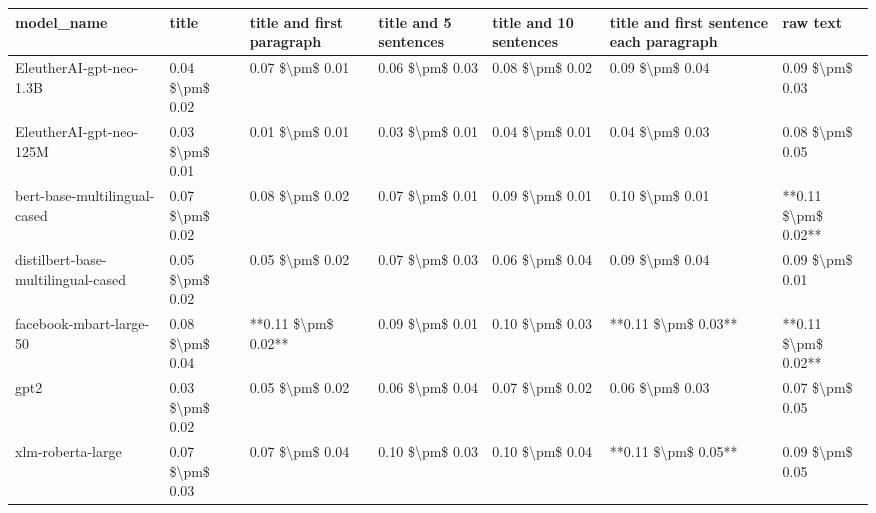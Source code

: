 \begin{tabular}{lllllll}
\toprule
                        model\_name &           title & title and first paragraph & title and 5 sentences & title and 10 sentences & title and first sentence each paragraph &            raw text \\
\midrule
           EleutherAI-gpt-neo-1.3B & 0.04 \$\textbackslash pm\$ 0.02 &           0.07 \$\textbackslash pm\$ 0.01 &       0.06 \$\textbackslash pm\$ 0.03 &        0.08 \$\textbackslash pm\$ 0.02 &                         0.09 \$\textbackslash pm\$ 0.04 &     0.09 \$\textbackslash pm\$ 0.03 \\
           EleutherAI-gpt-neo-125M & 0.03 \$\textbackslash pm\$ 0.01 &           0.01 \$\textbackslash pm\$ 0.01 &       0.03 \$\textbackslash pm\$ 0.01 &        0.04 \$\textbackslash pm\$ 0.01 &                         0.04 \$\textbackslash pm\$ 0.03 &     0.08 \$\textbackslash pm\$ 0.05 \\
      bert-base-multilingual-cased & 0.07 \$\textbackslash pm\$ 0.02 &           0.08 \$\textbackslash pm\$ 0.02 &       0.07 \$\textbackslash pm\$ 0.01 &        0.09 \$\textbackslash pm\$ 0.01 &                         0.10 \$\textbackslash pm\$ 0.01 & **0.11 \$\textbackslash pm\$ 0.02** \\
distilbert-base-multilingual-cased & 0.05 \$\textbackslash pm\$ 0.02 &           0.05 \$\textbackslash pm\$ 0.02 &       0.07 \$\textbackslash pm\$ 0.03 &        0.06 \$\textbackslash pm\$ 0.04 &                         0.09 \$\textbackslash pm\$ 0.04 &     0.09 \$\textbackslash pm\$ 0.01 \\
           facebook-mbart-large-50 & 0.08 \$\textbackslash pm\$ 0.04 &       **0.11 \$\textbackslash pm\$ 0.02** &       0.09 \$\textbackslash pm\$ 0.01 &        0.10 \$\textbackslash pm\$ 0.03 &                     **0.11 \$\textbackslash pm\$ 0.03** & **0.11 \$\textbackslash pm\$ 0.02** \\
                              gpt2 & 0.03 \$\textbackslash pm\$ 0.02 &           0.05 \$\textbackslash pm\$ 0.02 &       0.06 \$\textbackslash pm\$ 0.04 &        0.07 \$\textbackslash pm\$ 0.02 &                         0.06 \$\textbackslash pm\$ 0.03 &     0.07 \$\textbackslash pm\$ 0.05 \\
                 xlm-roberta-large & 0.07 \$\textbackslash pm\$ 0.03 &           0.07 \$\textbackslash pm\$ 0.04 &       0.10 \$\textbackslash pm\$ 0.03 &        0.10 \$\textbackslash pm\$ 0.04 &                     **0.11 \$\textbackslash pm\$ 0.05** &     0.09 \$\textbackslash pm\$ 0.05 \\
\bottomrule
\end{tabular}

